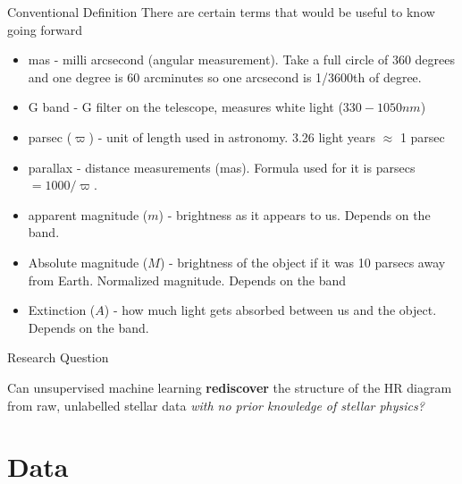 \documentclass[aspectratio=169]{beamer}
\begin{document}
\begin{frame}{Conventional Definition}
    There are certain terms that would be useful to know going forward \\[0.5em]
    \begin{itemize}
        \item mas - milli arcsecond (angular measurement). Take a full circle of 360 degrees and one degree is 60 arcminutes so one arcsecond is 1/3600th of degree.
        \item G band - G filter on the telescope, measures white light ($330-1050 nm$)
        \item parsec ($\varpi$) - unit of length used in astronomy. 3.26 light years $\approx$ 1 parsec
        \item parallax - distance measurements (mas). Formula used for it is parsecs $=1000/\varpi$.
        \item apparent magnitude ($m$) - brightness as it appears to us. Depends on the band.
        \item Absolute magnitude ($M$) - brightness of the object if it was 10 parsecs away from Earth. Normalized magnitude. Depends on the band
        \item Extinction ($A$) - how much light gets absorbed between us and the object. Depends on the band.
    \end{itemize}
\end{frame}

\begin{frame}{Research Question}
  \begin{center}
    \Large
    Can unsupervised machine learning \textbf{rediscover} the structure of the HR diagram from raw, unlabelled stellar data \textit{with no prior knowledge of stellar physics?}
  \end{center}
\end{frame}

\section{Data}
\end{document}
